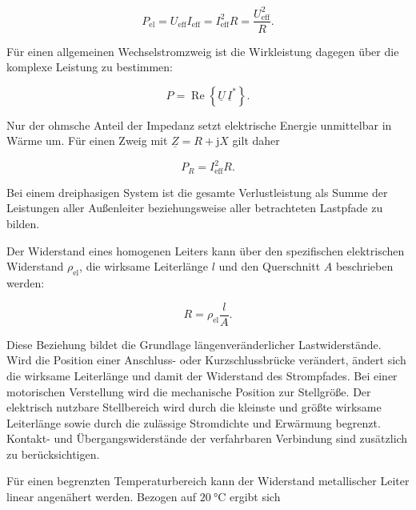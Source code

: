 \begin{equation}
  P_{\mathrm{el}}
  =
  U_{\mathrm{eff}}I_{\mathrm{eff}}
  =
  I_{\mathrm{eff}}^2R
  =
  \frac{U_{\mathrm{eff}}^2}{R}.
  \label{eq:elektrische_verlustleistung}
\end{equation}

Für einen allgemeinen Wechselstromzweig ist die Wirkleistung dagegen über die
komplexe Leistung zu bestimmen:

\begin{equation}
  P
  =
  \operatorname{Re}
  \left\{
    \underline{U}\,\underline{I}^{*}
  \right\}.
  \label{eq:komplexe_wirkleistung}
\end{equation}

Nur der ohmsche Anteil der Impedanz setzt elektrische Energie unmittelbar in
Wärme um. Für einen Zweig mit \(\underline Z=R+\mathrm jX\) gilt daher

\begin{equation}
  P_{R}
  =
  I_{\mathrm{eff}}^2R.
  \label{eq:widerstandsverlust_impedanz}
\end{equation}

Bei einem dreiphasigen System ist die gesamte Verlustleistung als Summe der
Leistungen aller Außenleiter beziehungsweise aller betrachteten Lastpfade zu
bilden.

Der Widerstand eines homogenen Leiters kann über den spezifischen elektrischen
Widerstand \(\rho_{\mathrm{el}}\), die wirksame Leiterlänge \(l\) und den
Querschnitt \(A\) beschrieben werden:

\begin{equation}
  R
  =
  \rho_{\mathrm{el}}\frac{l}{A}.
  \label{eq:widerstand_geometrie}
\end{equation}

Diese Beziehung bildet die Grundlage längenveränderlicher
Lastwiderstände. Wird die Position einer Anschluss- oder Kurzschlussbrücke
verändert, ändert sich die wirksame Leiterlänge und damit der Widerstand des
Strompfades. Bei einer motorischen Verstellung wird die mechanische Position
zur Stellgröße. Der elektrisch nutzbare Stellbereich wird durch die kleinste
und größte wirksame Leiterlänge sowie durch die zulässige Stromdichte und
Erwärmung begrenzt. Kontakt- und Übergangswiderstände der verfahrbaren
Verbindung sind zusätzlich zu berücksichtigen.

Für einen begrenzten Temperaturbereich kann der Widerstand metallischer Leiter
linear angenähert werden. Bezogen auf \(\SI{20}{\degreeCelsius}\) ergibt sich


